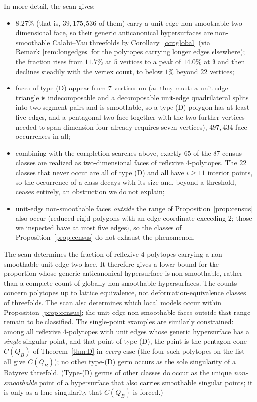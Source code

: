\documentclass[11pt]{amsart}
\theoremstyle{definition}
\theoremstyle{remark}
\begin{document}
In more detail, the scan gives:
\begin{itemize}
\item $8.27\%$ (that is, $39{,}175{,}536$ of them) carry a unit-edge
non-smoothable two-dimensional face, so their generic anticanonical
hypersurfaces are non-smoothable Calabi--Yau threefolds by
Corollary~\ref{cor:global} (via Remark~\ref{rem:longedges} for the
polytopes carrying longer edges elsewhere); the fraction rises from $11.7\%$ at $5$
vertices to a peak of $14.0\%$ at $9$ and then declines steadily with the
vertex count, to below $1\%$ beyond $22$ vertices;
\item faces of type \textup{(D)} appear from $7$ vertices on (as they
must: a unit-edge triangle is indecomposable and a decomposable unit-edge
quadrilateral splits into two segment pairs and is smoothable, so a
type-\textup{(D)} polygon has at least five edges, and a
pentagonal two-face together with the two further vertices needed to span
dimension four already requires seven vertices), $497{,}434$ face
occurrences in all;
\item combining with the completion searches above, exactly $65$ of the
$87$ census classes are realized as two-dimensional faces of reflexive
$4$-polytopes.  The $22$ classes that never occur are all of type
\textup{(D)} and all have $i \ge 11$ interior points, so the occurrence of
a class decays with its size and, beyond a threshold, ceases entirely,
an obstruction we do not explain;
\item unit-edge non-smoothable faces \emph{outside} the range of
Proposition~\ref{prop:census} also
occur (reduced-rigid polygons with an edge coordinate exceeding $2$; those we
inspected have at most five edges), so the classes of
Proposition~\ref{prop:census} do not exhaust the phenomenon.
\end{itemize}
The scan determines the fraction of reflexive
$4$-polytopes carrying a non-smoothable unit-edge two-face.  It therefore
gives a lower bound for the proportion whose generic anticanonical
hypersurface is non-smoothable, rather than a complete count of globally
non-smoothable hypersurfaces.  The counts concern polytopes up to lattice
equivalence, not deformation-equivalence classes of threefolds.
The scan also determines which local models occur within
Proposition~\ref{prop:census}; the unit-edge non-smoothable faces outside
that range remain to be classified.  The
single-point examples are similarly constrained: among
all reflexive $4$-polytopes with unit edges whose generic hypersurface
has a \emph{single} singular point, and that point of type \textup{(D)},
the point is the pentagon cone $C(Q_B)$ of Theorem~\ref{thm:D} in
\emph{every} case (the four such polytopes on the list all give
$C(Q_B)$); no other type-\textup{(D)} germ occurs as the sole singularity
of a Batyrev threefold.  (Type-\textup{(D)} germs of other classes do
occur as the
unique \emph{non-smoothable} point of a hypersurface that also carries
smoothable singular points; it is only as a lone singularity that
$C(Q_B)$ is forced.)
\end{document}
